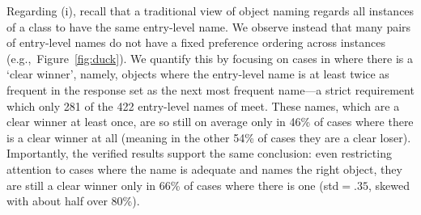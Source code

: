 Regarding (i), recall that a traditional view of object naming regards all instances of a class to have the same entry-level name.
We observe instead that many pairs of entry-level names do not have a fixed preference ordering across instances (e.g.,~Figure~\ref{fig:duck}). 
We quantify this by focusing on cases in \mn where there is a `clear winner', namely, objects where the entry-level name is at least twice as frequent in the response set as the next most frequent name---a strict requirement which only 281 of the 422 entry-level names of \mn meet.
These names, which are a clear winner at least once, are so still on average only in 46\% of cases where there is a clear winner at all (meaning in the other 54\% of cases they are a clear loser).
Importantly, the verified results support the same conclusion: 
even restricting attention to cases where the name is adequate and names the right object, they are still a clear winner only in 66\% of cases where there is one (std\mbox{$=.35$}, skewed with about half over 80\%).


